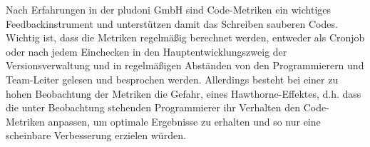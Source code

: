  Nach Erfahrungen in der pludoni GmbH sind Code-Metriken ein wichtiges Feedbackinstrument und unterstützen damit das Schreiben sauberen Codes. Wichtig ist, dass die Metriken regelmäßig berechnet werden, entweder als Cronjob oder nach jedem Einchecken in den Hauptentwicklungszweig der Versionsverwaltung und in regelmäßigen Abständen von den Programmierern und Team-Leiter gelesen und besprochen werden. Allerdings besteht bei einer zu hohen Beobachtung der Metriken die Gefahr, eines Hawthorne-Effektes, d.h. dass die unter Beobachtung stehenden Programmierer ihr Verhalten den Code-Metriken anpassen, um optimale Ergebnisse zu erhalten \citep[52. Karte]{langr_agile_2011} und so nur eine scheinbare Verbesserung erzielen würden.
